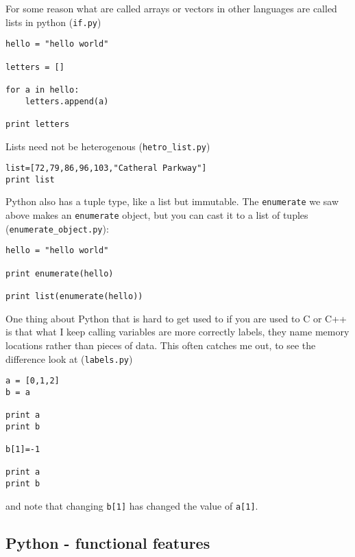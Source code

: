 \documentclass[11pt,a4paper]{scrartcl}
\begin{document}
For some reason what are called arrays or vectors in other languages
are called lists in python  (\texttt{if.py})
\begin{lstlisting}[numbers=right]
hello = "hello world"

letters = []

for a in hello:
    letters.append(a)

print letters
\end{lstlisting}
Lists need not be heterogenous  (\texttt{hetro\_list.py})
\begin{lstlisting}[numbers=right]
list=[72,79,86,96,103,"Catheral Parkway"]
print list
\end{lstlisting}
Python also has a tuple type, like a list but immutable. The
\texttt{enumerate} we saw above makes an \texttt{enumerate} object,
but you can cast it to a list of tuples (\texttt{enumerate\_object.py}):
\begin{lstlisting}[numbers=right]
hello = "hello world"

print enumerate(hello) 

print list(enumerate(hello)) 
\end{lstlisting}

One thing about Python that is hard to get used to if you are used to
C or C++ is that what I keep calling variables are more correctly
labels, they name memory locations rather than pieces of data. This
often catches me out, to see the difference look at (\texttt{labels.py})
\begin{lstlisting}[numbers=right]
a = [0,1,2]
b = a

print a
print b

b[1]=-1

print a
print b
\end{lstlisting}
and note that changing \texttt{b[1]} has changed the value of \texttt{a[1]}.

\subsection*{Python - functional features}
\end{document}
